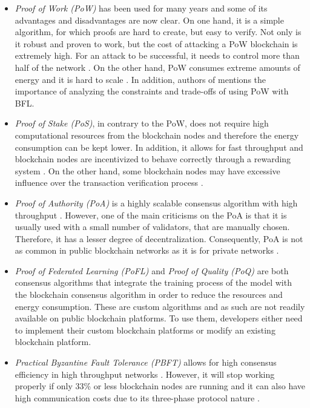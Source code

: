 \begin{itemize}
    \item \textit{Proof of Work (PoW)} has been used for many years and some of its advantages and disadvantages are now clear. On one hand, it is a simple algorithm, for which proofs are hard to create, but easy to verify. Not only is it robust and proven to work, but the cost of attacking a PoW blockchain is extremely high. For an attack to be successful, it needs to control more than half of the network \cite{li_blockchain_2021}. On the other hand, PoW consumes extreme amounts of energy and it is hard to scale \cite{edwood_2020, li_blockchain_2021, ccaf}. In addition, authors of \cite{10.48550/arxiv.2112.07938} mentions the importance of analyzing the constraints and trade-offs of using PoW with BFL.

    \item \textit{Proof of Stake (PoS)}, in contrary to the PoW, does not require high computational resources from the blockchain nodes and therefore the energy consumption can be kept lower. In addition, it allows for fast throughput and blockchain nodes are incentivized to behave correctly through a rewarding system \cite{li_blockchain_2021}. On the other hand, some blockchain nodes may have excessive influence over the transaction verification process \cite{li_blockchain_2021}.
    
    \item \textit{Proof of Authority (PoA)} is a highly scalable consensus algorithm with high throughput \cite{binance_academy_2020}. However, one of the main criticisms on the PoA is that it is usually used with a small number of validators, that are manually chosen. Therefore, it has a lesser degree of decentralization. Consequently, PoA is not as common in public blockchain networks as it is for private networks \cite{bPoA}.

    \item \textit{Proof of Federated Learning (PoFL)} \cite{9347812, 10.48550/arxiv.2007.15145} and \textit{Proof of Quality (PoQ)} \cite{8843900} are both consensus algorithms that integrate the training process of the model with the blockchain consensus algorithm in order to reduce the resources and energy consumption. These are custom algorithms and as such are not readily available on public blockchain platforms. To use them, developers either need to implement their custom blockchain platforms or modify an existing blockchain platform.

    \item \textit{Practical Byzantine Fault Tolerance (PBFT)} allows for high consensus efficiency in high throughput networks \cite{li_blockchain_2021}. However, it will stop working properly if only 33\% or less blockchain nodes are running and it can also have high communication costs due to its three-phase protocol nature \cite{li_blockchain_2021}.


\end{itemize}
